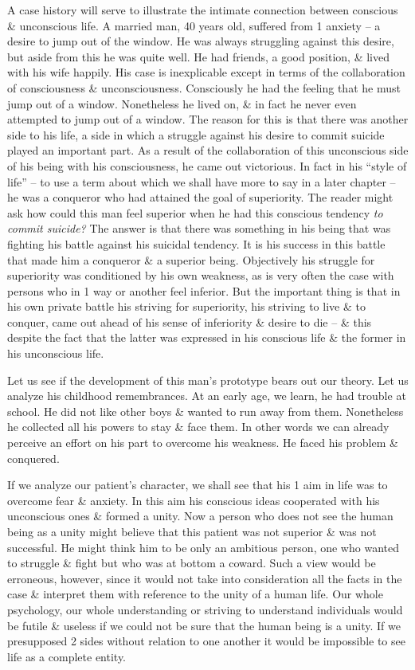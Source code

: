 \documentclass{article}
\begin{document}
A case history will serve to illustrate the intimate connection between conscious \& unconscious life. A married man, 40 years old, suffered from 1 anxiety -- a desire to jump out of the window. He was always struggling against this desire, but aside from this he was quite well. He had friends, a good position, \& lived with his wife happily. His case is inexplicable except in terms of the collaboration of consciousness \& unconsciousness. Consciously he had the feeling that he must jump out of a window. Nonetheless he lived on, \& in fact he never even attempted to jump out of a window. The reason for this is that there was another side to his life, a side in which a struggle against his desire to commit suicide played an important part. As a result of the collaboration of this unconscious side of his being with his consciousness, he came out victorious. In fact in his ``style of life'' -- to use a term about which we shall have more to say in a later chapter -- he was a conqueror who had attained the goal of superiority. The reader might ask how could this man feel superior when he had this conscious tendency \textit{to commit suicide?} The answer is that there was something in his being that was fighting his battle against his suicidal tendency. It is his success in this battle that made him a conqueror \& a superior being. Objectively his struggle for superiority was conditioned by his own weakness, as is very often the case with persons who in 1 way or another feel inferior. But the important thing is that in his own private battle his striving for superiority, his striving to live \& to conquer, came out ahead of his sense of inferiority \& desire to die -- \& this despite the fact that the latter was expressed in his conscious life \& the former in his unconscious life.

Let us see if the development of this man's prototype bears out our theory. Let us analyze his childhood remembrances. At an early age, we learn, he had trouble at school. He did not like other boys \& wanted to run away from them. Nonetheless he collected all his powers to stay \& face them. In other words we can already perceive an effort on his part to overcome his weakness. He faced his problem \& conquered.

If we analyze our patient's character, we shall see that his 1 aim in life was to overcome fear \& anxiety. In this aim his conscious ideas cooperated with his unconscious ones \& formed a unity. Now a person who does not see the human being as a unity might believe that this patient was not superior \& was not successful. He might think him to be only an ambitious person, one who wanted to struggle \& fight but who was at bottom a coward. Such a view would be erroneous, however, since it would not take into consideration all the facts in the case \& interpret them with reference to the unity of a human life. Our whole psychology, our whole understanding or striving to understand individuals would be futile \& useless if we could not be sure that the human being is a unity. If we presupposed 2 sides without relation to one another it would be impossible to see life as a complete entity.
\end{document}
